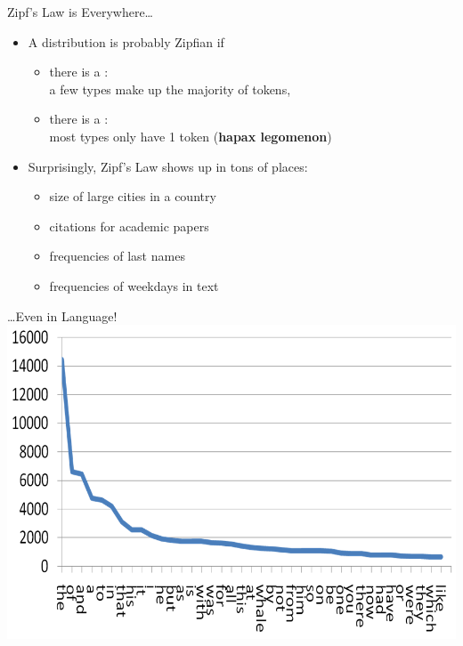 \documentclass[professionalfonts, xcolor={usenames,svgnames,x11names,table}]{beamer}
\begin{document}
\begin{frame}{Zipf's Law is Everywhere\ldots}
    \begin{itemize}
        \item A distribution is probably Zipfian if
            \begin{itemize}
                \item there is a :\\
                    a few types make up the majority of tokens,
                \item there is a :\\
                    most types only have 1 token (\textbf{hapax legomenon})
            \end{itemize}
        \item Surprisingly, Zipf's Law shows up in tons of places:
            \begin{itemize}
                \item size of large cities in a country
                \item citations for academic papers
                \item frequencies of last names
                \item frequencies of weekdays in text
            \end{itemize}
    \end{itemize}
\end{frame}

\begin{frame}{\ldots Even in Language!}
    \includegraphics[width=.9\linewidth]{./img/zipfgraph_english}
\end{frame}
\end{document}
